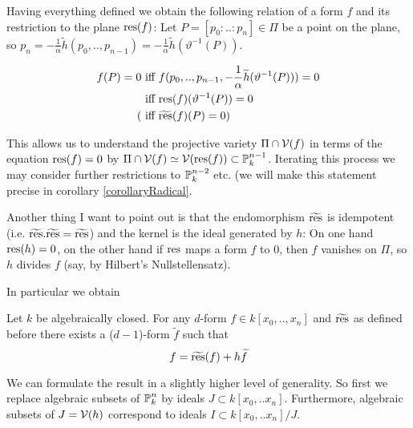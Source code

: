 Having everything defined we obtain the following relation of a form $f$ and its restriction to the plane ${\operatorname{res}}(f)$: Let $P = [p_0:..:p_n] \in \Pi$ be a point on the plane, so $p_n = -\frac 1\alpha \widetilde h(p_0,..,p_{n-1}) = -\frac 1\alpha \widetilde h(\vartheta^{-1}(P))$.

\begin{align}
f(P) = 0
&\text{ iff } f(p_0,..,p_{n-1},-\frac 1\alpha \widetilde h(\vartheta^{-1}(P))) = 0
\\
&\text { iff } {\operatorname{res}}(f)(\vartheta^{-1}(P)) = 0
\\
(&\text{ iff } \widetilde{{\operatorname{res}}}(f)(P) = 0)
\end{align}

This allows us to understand the projective variety $\Pi \cap \operatorname{\mathcal V}(f)$ in terms of the equation ${\operatorname{res}}(f) = 0$ by $\Pi \cap \operatorname{\mathcal V}(f) \simeq \operatorname{\mathcal V}({\operatorname{res}}(f)) \subset \operatorname{\mathbb P}^{n-1}_k$.
Iterating this process we may consider further restrictions to $\operatorname{\mathbb P}^{n-2}_k$ etc. (we will make this statement precise in corollary \ref{corollaryRadical}.

Another thing I want to point out is that the endomorphism $\widetilde{{\operatorname{res}}}$ is idempotent (i.e. $\widetilde{{\operatorname{res}}}.\widetilde{{\operatorname{res}}} = \widetilde{{\operatorname{res}}}$) and the kernel is the ideal generated by $h$: On one hand ${\operatorname{res}}(h) = 0$, on the other hand if ${\operatorname{res}}$ maps a form $f$ to $0$, then $f$ vanishes on $\Pi$, so $h$ divides $f$ (say, by Hilbert's Nullstellensatz).

In particular we obtain
\begin{proposition}
Let $k$ be algebraically closed.
For any $d$-form $f \in k[x_0,..,x_n]$ and $\widetilde{{\operatorname{res}}}$ as defined before there exists a ($d-1$)-form $\widetilde f$ such that
\begin{equation}
f = \widetilde{{\operatorname{res}}}(f) +  h\widetilde f
\end{equation}
\end{proposition}

\begin{todo}
\item We can formulate the result in a slightly higher level of generality. So first we replace algebraic subsets of $\operatorname{\mathbb P}^n_k$ by ideals $J \subset k[x_0,..x_n]$.
Furthermore, algebraic subsets of $J = \operatorname{\mathcal V}(h)$ correspond to ideals $I \subset k[x_0,..x_n]/J$.
\end{todo}

